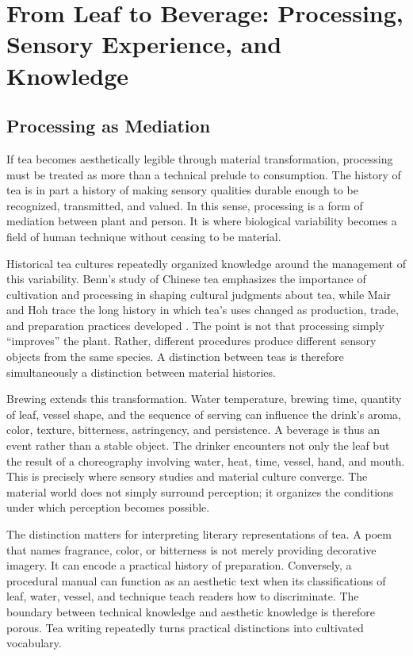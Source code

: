 \documentclass[numbers]{IntechOpen-Book}
\begin{document}
\section{From Leaf to Beverage: Processing, Sensory Experience, and Knowledge}

\subsection{Processing as Mediation}

If tea becomes aesthetically legible through material transformation, processing must be treated as more than a technical prelude to consumption. The history of tea is in part a history of making sensory qualities durable enough to be recognized, transmitted, and valued. In this sense, processing is a form of mediation between plant and person. It is where biological variability becomes a field of human technique without ceasing to be material.

Historical tea cultures repeatedly organized knowledge around the management of this variability. Benn's study of Chinese tea emphasizes the importance of cultivation and processing in shaping cultural judgments about tea, while Mair and Hoh trace the long history in which tea's uses changed as production, trade, and preparation practices developed \cite{benn2015book,mairhoh2009}. The point is not that processing simply ``improves'' the plant. Rather, different procedures produce different sensory objects from the same species. A distinction between teas is therefore simultaneously a distinction between material histories.

Brewing extends this transformation. Water temperature, brewing time, quantity of leaf, vessel shape, and the sequence of serving can influence the drink's aroma, color, texture, bitterness, astringency, and persistence. A beverage is thus an event rather than a stable object. The drinker encounters not only the leaf but the result of a choreography involving water, heat, time, vessel, hand, and mouth. This is precisely where sensory studies and material culture converge. The material world does not simply surround perception; it organizes the conditions under which perception becomes possible.

The distinction matters for interpreting literary representations of tea. A poem that names fragrance, color, or bitterness is not merely providing decorative imagery. It can encode a practical history of preparation. Conversely, a procedural manual can function as an aesthetic text when its classifications of leaf, water, vessel, and technique teach readers how to discriminate. The boundary between technical knowledge and aesthetic knowledge is therefore porous. Tea writing repeatedly turns practical distinctions into cultivated vocabulary.
\end{document}
